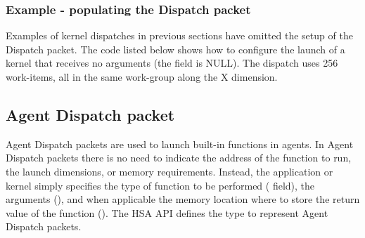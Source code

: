 \documentclass[final]{book}
\begin{document}
\subsubsection{Example - populating the Dispatch packet}
Examples of kernel dispatches in previous sections have omitted the setup of the
Dispatch packet. The code listed below shows how to configure the launch of a
kernel that receives no arguments (the
 field is NULL). The
dispatch uses 256 work-items, all in the same work-group along the X dimension.



\subsection{Agent Dispatch packet}\label{agent-packet}

Agent Dispatch packets are used to launch built-in functions in agents. In Agent
Dispatch packets there is no need to indicate the address of the function to
run, the launch dimensions, or memory requirements. Instead, the application or
kernel simply specifies the type of function to be performed
( field), the arguments
(), and when applicable the memory
location where to store the return value of the function
(). The HSA API defines the
type  to represent Agent Dispatch packets.
\end{document}
